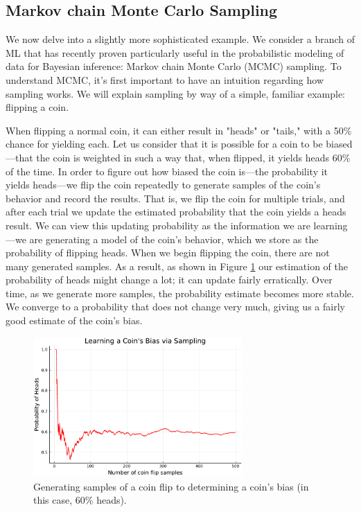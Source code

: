 \documentclass[sigplan,screen]{acmart}
\begin{document}
\subsection{Markov chain Monte Carlo Sampling} \label{sec:mcmc}
We now delve into a slightly more sophisticated example. We consider a branch of ML that has recently proven particularly useful in the probabilistic modeling of data for Bayesian inference: Markov chain Monte Carlo (MCMC) sampling. To understand MCMC, it's first important to have an intuition regarding how sampling works. We will explain sampling by way of a simple, familiar example: flipping a coin.

When flipping a normal coin, it can either result in "heads" or "tails," with a 50\% chance for yielding each. Let us consider that it is possible for a coin to be biased---that the coin is weighted in such a way that, when flipped, it yields heads 60\% of the time. In order to figure out how biased the coin is---the probability it yields heads---we flip the coin repeatedly to generate samples of the coin's behavior and record the results. That is, we flip the coin for multiple trials, and after each trial we update the estimated probability that the coin yields a heads result. We can view this updating probability as the information we are learning---we are generating a model of the coin's behavior, which we store as the probability of flipping heads. When we begin flipping the coin, there are not many generated samples. As a result, as shown in Figure \ref{fig:coinflip} our estimation of the probability of heads might change a lot; it can update fairly erratically. Over time, as we generate more samples, the probability estimate becomes more stable. We converge to a probability that does not change very much, giving us a fairly good estimate of the coin's bias.  

\begin{figure}[h]
	\includegraphics[width=8cm]{figs/flip.pdf}
	\caption{Generating samples of a coin flip to determining a coin's bias (in this case, 60\% heads).}
	\label{fig:coinflip}
\end{figure}
\end{document}
